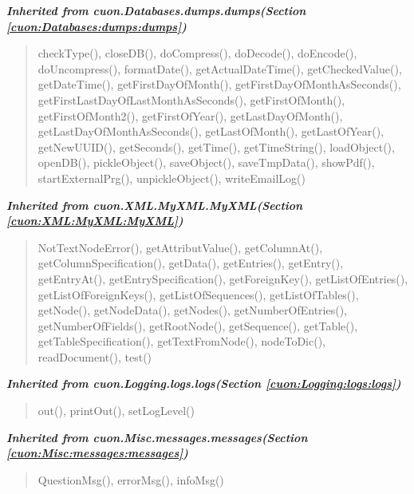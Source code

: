 \large{\textbf{\textit{Inherited from cuon.Databases.dumps.dumps\textit{(Section \ref{cuon:Databases:dumps:dumps})}}}}

\begin{quote}
checkType(), closeDB(), doCompress(), doDecode(), doEncode(), doUncompress(), formatDate(), getActualDateTime(), getCheckedValue(), getDateTime(), getFirstDayOfMonth(), getFirstDayOfMonthAsSeconds(), getFirstLastDayOfLastMonthAsSeconds(), getFirstOfMonth(), getFirstOfMonth2(), getFirstOfYear(), getLastDayOfMonth(), getLastDayOfMonthAsSeconds(), getLastOfMonth(), getLastOfYear(), getNewUUID(), getSeconds(), getTime(), getTimeString(), loadObject(), openDB(), pickleObject(), saveObject(), saveTmpData(), showPdf(), startExternalPrg(), unpickleObject(), writeEmailLog()
\end{quote}

\large{\textbf{\textit{Inherited from cuon.XML.MyXML.MyXML\textit{(Section \ref{cuon:XML:MyXML:MyXML})}}}}

\begin{quote}
NotTextNodeError(), getAttributValue(), getColumnAt(), getColumnSpecification(), getData(), getEntries(), getEntry(), getEntryAt(), getEntrySpecification(), getForeignKey(), getListOfEntries(), getListOfForeignKeys(), getListOfSequences(), getListOfTables(), getNode(), getNodeData(), getNodes(), getNumberOfEntries(), getNumberOfFields(), getRootNode(), getSequence(), getTable(), getTableSpecification(), getTextFromNode(), nodeToDic(), readDocument(), test()
\end{quote}

\large{\textbf{\textit{Inherited from cuon.Logging.logs.logs\textit{(Section \ref{cuon:Logging:logs:logs})}}}}

\begin{quote}
out(), printOut(), setLogLevel()
\end{quote}

\large{\textbf{\textit{Inherited from cuon.Misc.messages.messages\textit{(Section \ref{cuon:Misc:messages:messages})}}}}

\begin{quote}
QuestionMsg(), errorMsg(), infoMsg()
\end{quote}
